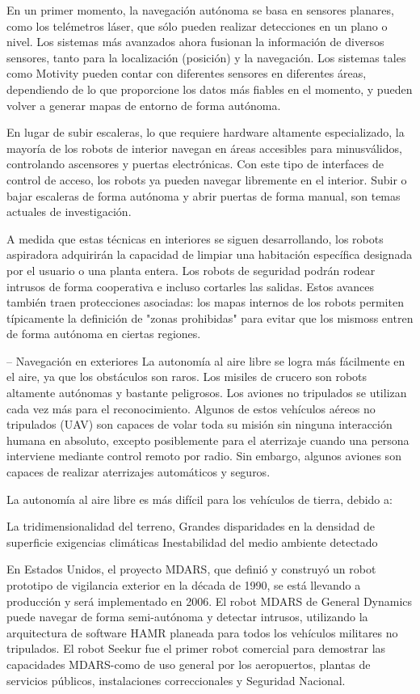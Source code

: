 En un primer momento, la navegación autónoma se basa en sensores planares, como los telémetros láser, que sólo pueden realizar detecciones en un plano o nivel. Los sistemas más avanzados ahora fusionan la información de diversos sensores, tanto para la localización (posición) y la navegación. Los sistemas tales como Motivity pueden contar con diferentes sensores en diferentes áreas, dependiendo de lo que proporcione los datos más fiables en el momento, y pueden volver a generar mapas de entorno de forma autónoma. 

En lugar de subir escaleras, lo que requiere hardware altamente especializado, la mayoría de los robots de interior navegan en áreas accesibles para minusválidos, controlando ascensores y puertas electrónicas. Con este tipo de interfaces de control de acceso, los robots ya pueden navegar libremente en el interior. Subir o bajar escaleras de forma autónoma y abrir puertas de forma manual, son temas actuales de investigación. 

A medida que estas técnicas en interiores se siguen desarrollando, los robots aspiradora adquirirán la capacidad de limpiar una habitación específica designada por el usuario o una planta entera. Los robots de seguridad podrán rodear intrusos de forma cooperativa e incluso cortarles las salidas. Estos avances también traen protecciones asociadas: los mapas internos de los robots permiten típicamente la definición de "zonas prohibidas" para evitar que los mismoss entren de forma autónoma en ciertas regiones. 

-- Navegación en exteriores
La autonomía al aire libre se logra más fácilmente en el aire, ya que los obstáculos son raros. Los misiles de crucero son robots altamente autónomas y bastante peligrosos. Los aviones no tripulados se utilizan cada vez más para el reconocimiento. Algunos de estos vehículos aéreos no tripulados (UAV) son capaces de volar toda su misión sin ninguna interacción humana en absoluto, excepto posiblemente para el aterrizaje cuando una persona interviene mediante control remoto por radio. Sin embargo, algunos aviones son capaces de realizar aterrizajes automáticos y seguros.

La autonomía al aire libre es más difícil para los vehículos de tierra, debido a: 

La tridimensionalidad del terreno, 
Grandes disparidades en la densidad de superficie 
exigencias climáticas 
Inestabilidad del medio ambiente detectado 

En Estados Unidos, el proyecto MDARS, que definió y construyó un robot prototipo de vigilancia exterior en la década de 1990, se está llevando a producción y será implementado en 2006. El robot MDARS de General Dynamics puede navegar de forma semi-autónoma y detectar intrusos, utilizando la arquitectura de software HAMR planeada para todos los vehículos militares no tripulados. El robot Seekur fue el primer robot comercial para demostrar las capacidades MDARS-como de uso general por los aeropuertos, plantas de servicios públicos, instalaciones correccionales y Seguridad Nacional. 


